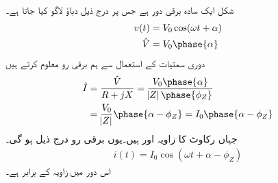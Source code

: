 شکل    ایک سادہ   برقی دور ہے جس پر درج ذیل دباؤ لاگو کیا جاتا ہے۔
\begin{gather}
\begin{aligned}
v(t)&=V_0 \cos (\omega t +\alpha)\\
\hat{V}&=V_0 \phase{\alpha}
\end{aligned}
\end{gather}
دوری سمتیات کے استعمال سے ہم  برقی رو  معلوم کرتے ہیں
\begin{gather}
\begin{aligned}
\hat{I}&=\frac{\hat{V}}{R+j X}=\frac{V_0 \phase{\alpha}}{\abs{Z} \phase {\phi_Z}}\\
&=\frac{V_0}{\abs{Z}} \phase{\alpha-\phi_Z}=I_0 \phase{\alpha-\phi_Z}
\end{aligned}
\end{gather}
جہاں  رکاوٹ کا زاویہ اور    ہیں۔یوں  برقی رو درج ذیل ہو گی۔
\begin{align}\label{مساوات_بنیادی_حقائق_دوری_سمتیہ_سے_مزاحمت_امالہ_دور_حل}
i(t)=I_0 \cos (\omega t +\alpha-\phi_Z)
\end{align}
اس دور میں   زاویہ  کے برابر ہے۔ 

